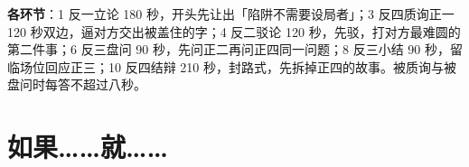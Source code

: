 \documentclass[quick,con]{debate}
\begin{document}
\textbf{各环节}：1 反一立论 180 秒，开头先让出「陷阱不需要设局者」；3 反四质询正一 120 秒双边，逼对方交出被盖住的字；4 反二驳论 120 秒，先驳，打对方最难圆的第二件事；6 反三盘问 90 秒，先问正二再问正四同一问题；8 反三小结 90 秒，留临场位回应正三；10 反四结辩 210 秒，封路式，先拆掉正四的故事。被质询与被盘问时每答不超过八秒。

\section{如果……就……}
\begin{contingency}
\end{contingency}
\end{document}
